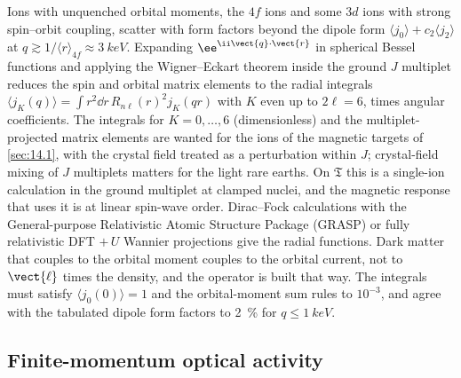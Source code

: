 Ions with unquenched orbital moments, the $4f$ ions and some $3d$ ions with strong spin--orbit coupling, scatter with form factors beyond the dipole form $\langle j_0\rangle + c_2\langle j_2\rangle$ at $q \gtrsim 1/\langle r\rangle_{4f} \approx \SI{3}{keV}$. Expanding $\ee^{\ii\vect{q}\cdot\vect{r}}$ in spherical Bessel functions and applying the Wigner--Eckart theorem inside the ground $J$ multiplet reduces the spin and orbital matrix elements to the radial integrals $\langle j_K(q)\rangle = \int r^2\dd r\,R_{n\ell}(r)^2j_K(qr)$ with $K$ even up to $2\ell = 6$, times angular coefficients. The integrals for $K = 0,\dots,6$ (dimensionless) and the multiplet-projected matrix elements are wanted for the ions of the magnetic targets of \cref{sec:14.1}, with the crystal field treated as a perturbation within $J$; crystal-field mixing of $J$ multiplets matters for the light rare earths. On $\mathfrak{T}$ this is a single-ion calculation in the ground multiplet at clamped nuclei, and the magnetic response that uses it is at linear spin-wave order. Dirac--Fock calculations with the General-purpose Relativistic Atomic Structure Package (GRASP) or fully relativistic DFT $+\,U$ Wannier projections give the radial functions. Dark matter that couples to the orbital moment couples to the orbital current, not to $\vect{\ell}$ times the density, and the operator is built that way. The integrals must satisfy $\langle j_0(0)\rangle = 1$ and the orbital-moment sum rules to $10^{-3}$, and agree with the tabulated dipole form factors to \SI{2}{\percent} for $q \le \SI{1}{keV}$.

\subsection{Finite-momentum optical activity}

